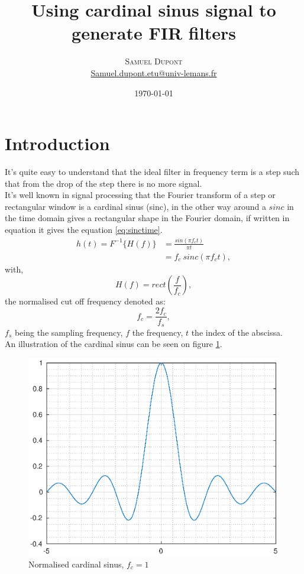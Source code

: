 \documentclass[twoside,twocolumn]{article}
\title{Using cardinal sinus signal to generate FIR filters } %
\author{%
\textsc{Samuel Dupont}\\ %
\normalsize \href{mailto:Samuel.dupont.etu@univ-lemans.fr}{Samuel.dupont.etu@univ-lemans.fr } 
}
\date{\today} %
\begin{document}
\maketitle


\section{Introduction}
It's quite easy to understand that the ideal filter in frequency term is a step such that from the drop of the step there is no more signal.\\
It's well known in signal processing that the Fourier transform of a step or rectangular window is a cardinal sinus (sinc), in the other way around a $sinc$ in the time domain gives a rectangular shape in the Fourier domain, if written in  equation it gives the equation \ref{eq:sinctime}. 
\begin{equation}
	\begin{split}
		h(t)=F^{-1}\lbrace H(f) \rbrace & =  \frac{sin(\pi f_c t)}{\pi t}\\
										& =  f_c\  sinc(\pi f_ct),
	\end{split}
\label{eq:sinctime}
\end{equation} 
with,
\begin{equation}
H(f)=rect(\frac{f}{f_c}),
\label{eq:rect}
\end{equation} 
the normalised cut off frequency denoted as:
\begin{equation}
f_c=\frac{2f_c}{f_s},
\end{equation} 
$f_s$ being the sampling frequency, $f$ the frequency, $t$ the index of the abscissa.\\
An illustration of the cardinal sinus can be seen on figure \ref{sinc}. 
\begin{figure}[h!]
	\centering
	\includegraphics[scale=0.45]{./images/normalised_sinus.eps}
	\caption{Normalised cardinal sinus, $f_c=1$}
	\label{sinc}
\end{figure}
\end{document}

